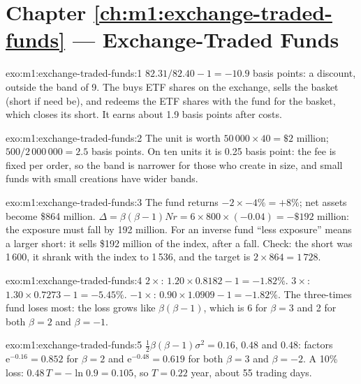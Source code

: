 \section*{Chapter \ref{ch:m1:exchange-traded-funds} --- Exchange-Traded Funds}

\begin{solution}{exo:m1:exchange-traded-funds:1}
$82.31/82.40 - 1 = -10.9$ basis points: a discount, outside the band of 9.
The  buys ETF shares on the exchange, sells the basket
(short if need be), and redeems the ETF shares with the fund for the basket,
which closes its short. It earns about 1.9 basis points after costs.
\end{solution}

\begin{solution}{exo:m1:exchange-traded-funds:2}
The unit is worth $50\,000 \times 40 = \$2$ million; $500/2\,000\,000 = 2.5$
basis points. On ten units it is 0.25 basis point: the fee is fixed per
order, so the band is narrower for those who create in size, and small funds
with small creations have wider bands.
\end{solution}

\begin{solution}{exo:m1:exchange-traded-funds:3}
The fund returns $-2 \times -4\% = +8\%$; net assets become \$864 million.
$\Delta = \beta(\beta-1)Nr = 6 \times 800 \times (-0.04) = -\$192$ million:
the exposure must fall by 192 million. For an inverse fund ``less exposure''
means a larger short: it sells \$192 million of the index, after a fall. Check:
the short was 1\,600, it shrank with the index to 1\,536, and the target is $2
\times 864 = 1\,728$.
\end{solution}

\begin{solution}{exo:m1:exchange-traded-funds:4}
$2\times$: $1.20 \times 0.8182 - 1 = -1.82\%$. $3\times$: $1.30 \times 0.7273
- 1 = -5.45\%$. $-1\times$: $0.90 \times 1.0909 - 1 = -1.82\%$. The
three-times fund loses most: the loss grows like $\beta(\beta-1)$, which is
6 for $\beta = 3$ and 2 for both $\beta = 2$ and $\beta = -1$.
\end{solution}

\begin{solution}{exo:m1:exchange-traded-funds:5}
$\tfrac12\beta(\beta-1)\sigma^2 = 0.16$, $0.48$ and $0.48$: factors
$\mathrm{e}^{-0.16} = 0.852$ for $\beta = 2$ and $\mathrm{e}^{-0.48} = 0.619$
for both $\beta = 3$ and $\beta = -2$. A 10\% loss: $0.48\,T = -\ln 0.9 =
0.105$, so $T = 0.22$ year, about 55 trading days.
\end{solution}

